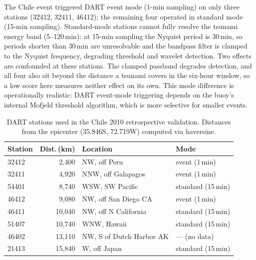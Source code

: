 \documentclass{article}
\begin{document}
The Chile event triggered DART event mode (1-min sampling)
on only three stations (32412, 32411, 46412); the remaining four
operated in standard mode (15-min sampling).
Standard-mode stations cannot fully resolve the tsunami energy band
(5--120\,min): at 15-min sampling the Nyquist period is 30\,min,
so periods shorter than 30\,min are unresolvable and the bandpass
filter is clamped to the Nyquist frequency, degrading threshold and
wavelet detection.  Two effects are confounded at these stations.  The
clamped passband degrades detection, and all four also sit beyond the
distance a tsunami covers in the six-hour window, so a low score here
measures neither effect on its own.
This mode difference is operationally realistic: DART event-mode
triggering depends on the buoy's internal Mofjeld threshold
algorithm, which is more selective for smaller events.

\begin{table}[!htb]
\centering
\caption{DART stations used in the Chile 2010 retrospective validation.
  Distances from the epicenter (35.846\textdegree S, 72.719\textdegree W)
  computed via haversine.}
\label{tab:chile-stations}
\small
\begin{tabular}{lrll}
\toprule
\textbf{Station} & \textbf{Dist.\,(km)} & \textbf{Location} & \textbf{Mode} \\
\midrule
32412 & 2{,}400   & NW, off Peru             & event (1\,min) \\
32411 & 4{,}920   & NNW, off Galapagos        & event (1\,min) \\
54401 & 8{,}740   & WSW, SW Pacific            & standard (15\,min) \\
46412 & 9{,}080   & NW, off San Diego CA      & event (1\,min) \\
46411 & 10{,}040  & NW, off N California    & standard (15\,min) \\
51407 & 10{,}740  & WNW, Hawaii              & standard (15\,min) \\
46402 & 13{,}110  & NW, S of Dutch Harbor AK & --- (no data) \\
21413 & 15{,}840  & W, off Japan             & standard (15\,min) \\
\bottomrule
\end{tabular}
\end{table}
\end{document}
